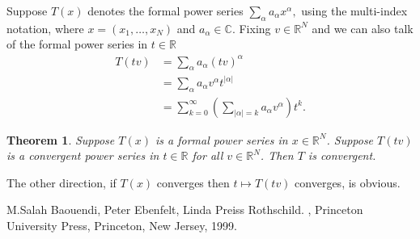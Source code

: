 \documentclass[12pt]{article}
\theoremstyle{theorem}
\newtheorem*{thm}{Theorem}
\theoremstyle{definition}
\theoremstyle{remark}
\begin{document}
Suppose $T(x)$ denotes the formal power series 
$\sum_{\alpha} a_\alpha x^\alpha ,$ using the multi-index notation,
where $x = (x_1,\ldots,x_N)$ and $a_\alpha \in \mathbb{C}.$
Fixing $v \in {\mathbb{R}}^N$ and we can also talk of the formal power series in $t \in \mathbb{R}$
\begin{equation*}
\begin{split}
T(tv) & = \sum_{\alpha} a_\alpha (tv)^\alpha \\
 & = \sum_{\alpha} a_\alpha v^\alpha t^{\lvert \alpha \rvert} \\
 & = \sum_{k=0}^\infty \left( \sum_{\lvert \alpha \rvert = k} a_\alpha v^\alpha \right) t^k .
\end{split}
\end{equation*}

\begin{thm}
Suppose $T(x)$ is a formal power series in $x \in {\mathbb{R}}^N$.  Suppose 
$T(tv)$ is a convergent power series in $t \in \mathbb{R}$ for
all $v \in {\mathbb{R}}^N$.  Then $T$ is convergent.
\end{thm}

The other direction, if $T(x)$ converges then $t \mapsto T(tv)$ converges, is obvious.

%


\begin{thebibliography}{9}
M.\@ Salah Baouendi,
Peter Ebenfelt,
Linda Preiss Rothschild.
{\em {}},
Princeton University Press,
Princeton, New Jersey, 1999.
\end{thebibliography}
\end{document}
